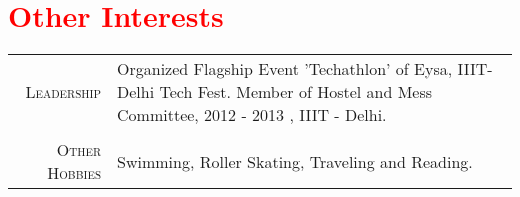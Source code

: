 \documentclass[a4paper,11pt]{article} %
\begin{document}
\section{ \texorpdfstring{\textcolor{red}{Other Interests}}{Other Interests} }
\begin{tabular}{rp{13cm}}

\textsc{Leadership} & Organized Flagship Event 'Techathlon' of Eysa, IIIT-Delhi Tech Fest.\newline
			    Member of Hostel and Mess Committee, 2012 - 2013 , IIIT - Delhi. \\ \\
\textsc{Other Hobbies} & Swimming, Roller Skating, Traveling and Reading.\\


\end{tabular}
\end{document}
